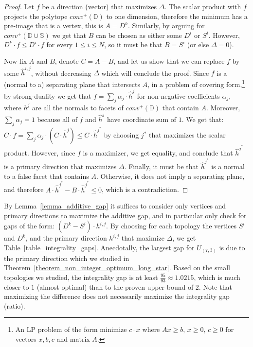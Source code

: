 \begin{proof}
Let $f$ be a direction (vector) that maximizes $\Delta$. The scalar product with $f$ projects the polytope $conv^+(\mathbb{D})$ to one dimension, therefore the minimum has a pre-image that is a vertex, this is $A = D^k$. Similarly, by arguing for $conv^+(\mathbb{D} \cup \mathbb{S})$ we get that $B$ can be chosen as either some $D^i$ or $S^i$. However, $D^k \cdot f \le D^i \cdot f$ for every $1 \le i \le N$, so it must be that $B = S^i$ (or else $\Delta = 0$).

Now fix $A$ and $B$, denote $C = A-B$, and let us show that we can replace $f$ by some $\hat{h}^{i,j}$, without decreasing $\Delta$ which will conclude the proof. Since $f$ is a (normal to a) separating plane that intersects $A$, in a problem of covering form,\footnote{An LP problem of the form minimize $c \cdot x$ where $Ax \ge b$, $x \ge 0$, $c \ge 0$ for vectors $x,b,c$ and matrix $A$.} by strong-duality we get that $f = \sum_{j}{\alpha_j \cdot \hat{h}^j}$ for non-negative coefficients $\alpha_j$, where $h^j$ are all the normals to facets of $conv^+(\mathbb{D})$ that contain $A$. Moreover, $\sum_j {\alpha_j} = 1$ because all of $f$ and $\hat{h}^j$ have coordinate sum of $1$. We get that:
$C \cdot f = \sum_{j}{\alpha_j \cdot (C \cdot \hat{h}^j)} \le C \cdot \hat{h}^{j^*}$ by choosing $j^*$ that maximizes the scalar product. However, since $f$ is a maximizer, we get equality, and conclude that $\hat{h}^{j^*}$ is a primary direction that maximizes $\Delta$. Finally, it must be that $\hat{h}^{j^*}$ is a normal to a false facet that contains $A$. Otherwise, it does not imply a separating plane, and therefore $A \cdot \hat{h}^{j^*} - B \cdot \hat{h}^{j^*} \le 0$, which is a contradiction.
\end{proof}

By Lemma~\ref{lemma_additive_gap} it suffices to consider only vertices and primary directions to maximize the additive gap, and in particular only check for gaps of the form: $(D^k - S^i) \cdot h^{i,j}$. By choosing for each topology the vertices $S^i$ and $D^k$, and the primary direction $h^{i,j}$ that maximize $\Delta$, we get Table~\ref{table_integrality_gaps}. Anecdotally, the largest gap for $U_{(7,3)}$ is due to the primary direction which we studied in Theorem~\ref{theorem_non_integer_optimum_long_star}. Based on the small topologies we studied, the integrality gap is at least $\frac{95}{93} \approx 1.0215$, which is much closer to $1$ (almost optimal) than to the proven upper bound of $2$. Note that maximizing the difference does not necessarily maximize the integrality gap (ratio).

